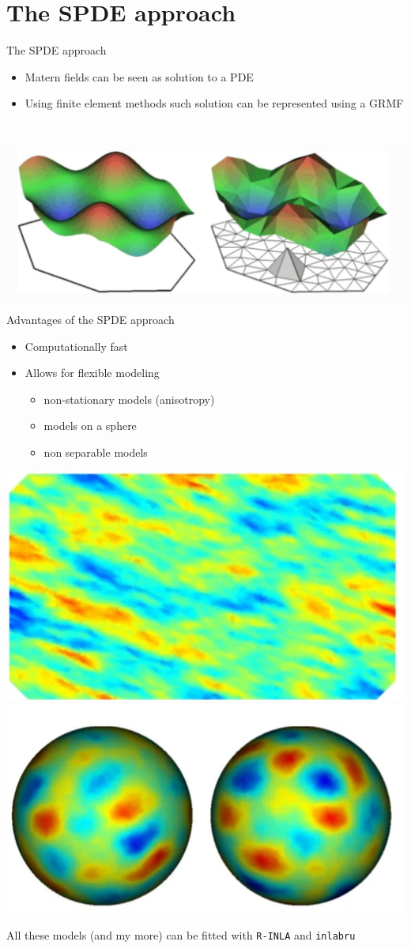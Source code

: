 \documentclass[
  ignorenonframetext,
]{beamer}
\begin{document}
\hypertarget{the-spde-approach}{%
\section{The SPDE approach}\label{the-spde-approach}}

\begin{frame}{The SPDE approach}
\protect\hypertarget{the-spde-approach-1}{}
\begin{itemize}
\item
  Matern fields can be seen as solution to a PDE
\item
  Using finite element methods such solution can be represented using a
  GRMF\\
  \strut \\
\end{itemize}

\begin{center}\includegraphics[width=0.7\linewidth]{graphics/spde} \end{center}
\end{frame}

\begin{frame}[fragile]{Advantages of the SPDE approach}
\protect\hypertarget{advantages-of-the-spde-approach}{}
\begin{itemize}
\item
  Computationally fast
\item
  Allows for flexible modeling

  \begin{itemize}
  \item
    non-stationary models (anisotropy)
  \item
    models on a sphere
  \item
    non separable models
  \end{itemize}
\end{itemize}

\begin{center}\includegraphics[width=0.29\linewidth,height=0.2\textheight]{graphics/fig1} \includegraphics[width=0.29\linewidth,height=0.2\textheight]{graphics/fig2} \end{center}

All these models (and my more) can be fitted with \texttt{R-INLA} and
\texttt{inlabru}
\end{frame}
\end{document}
